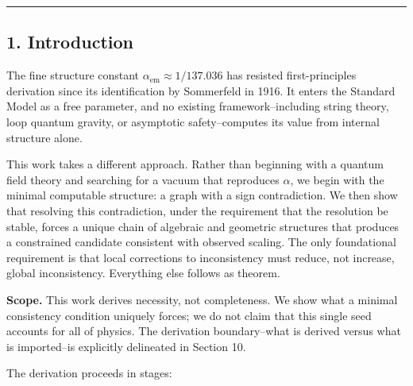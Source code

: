 \documentclass[
]{article}
\begin{document}
\begin{center}\rule{0.5\linewidth}{0.5pt}\end{center}

\hypertarget{introduction}{%
\subsection{1. Introduction}\label{introduction}}

The fine structure constant \(\alpha_{\mathrm{em}} \approx 1/137.036\)
has resisted first-principles derivation since its identification by
Sommerfeld in 1916. It enters the Standard Model as a free parameter,
and no existing framework--including string theory, loop quantum
gravity, or asymptotic safety--computes its value from internal
structure alone.

This work takes a different approach. Rather than beginning with a
quantum field theory and searching for a vacuum that reproduces
\(\alpha\), we begin with the minimal computable structure: a graph with
a sign contradiction. We then show that resolving this contradiction,
under the requirement that the resolution be stable, forces a unique
chain of algebraic and geometric structures that produces a constrained
candidate consistent with observed scaling. The only foundational
requirement is that local corrections to inconsistency must reduce, not
increase, global inconsistency. Everything else follows as theorem.

\textbf{Scope.} This work derives necessity, not completeness. We show
what a minimal consistency condition uniquely forces; we do not claim
that this single seed accounts for all of physics. The derivation
boundary--what is derived versus what is imported--is explicitly
delineated in Section 10.

The derivation proceeds in stages:
\end{document}
